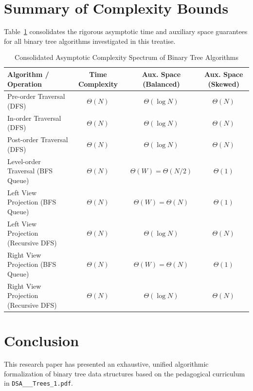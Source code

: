 \documentclass[10pt,journal,compsoc,onecolumn]{IEEEtran}
\begin{document}
\section{Summary of Complexity Bounds}
\label{sec:summary_bounds}

Table~\ref{tab:master_complexity_summary} consolidates the rigorous asymptotic time and auxiliary space guarantees for all binary tree algorithms investigated in this treatise.

\begin{table}[htbp]
\centering
\caption{Consolidated Asymptotic Complexity Spectrum of Binary Tree Algorithms}
\label{tab:master_complexity_summary}
\begin{tabular}{lccc}
\toprule
\textbf{Algorithm / Operation} & \textbf{Time Complexity} & \textbf{Aux. Space (Balanced)} & \textbf{Aux. Space (Skewed)} \\
\midrule
Pre-order Traversal (DFS) & $\Theta(N)$ & $\Theta(\log N)$ & $\Theta(N)$ \\
In-order Traversal (DFS) & $\Theta(N)$ & $\Theta(\log N)$ & $\Theta(N)$ \\
Post-order Traversal (DFS) & $\Theta(N)$ & $\Theta(\log N)$ & $\Theta(N)$ \\
Level-order Traversal (BFS Queue) & $\Theta(N)$ & $\Theta(W) = \Theta(N/2)$ & $\Theta(1)$ \\
Left View Projection (BFS Queue) & $\Theta(N)$ & $\Theta(W) = \Theta(N)$ & $\Theta(1)$ \\
Left View Projection (Recursive DFS) & $\Theta(N)$ & $\Theta(\log N)$ & $\Theta(N)$ \\
Right View Projection (BFS Queue) & $\Theta(N)$ & $\Theta(W) = \Theta(N)$ & $\Theta(1)$ \\
Right View Projection (Recursive DFS) & $\Theta(N)$ & $\Theta(\log N)$ & $\Theta(N)$ \\
\bottomrule
\end{tabular}
\end{table}

\section{Conclusion}
\label{sec:conclusion}

This research paper has presented an exhaustive, unified algorithmic formalization of binary tree data structures based on the pedagogical curriculum in \texttt{DSA\_\_\_Trees\_1.pdf}.
\end{document}
